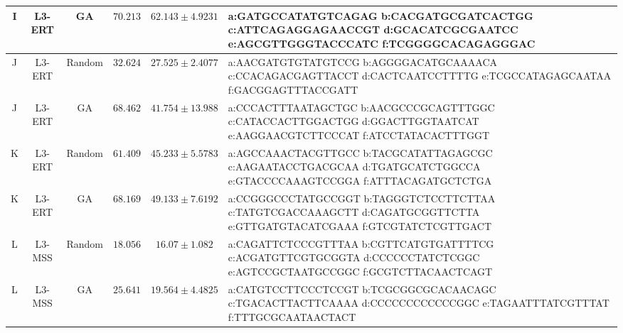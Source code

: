 \begin{table*}[h]
\begin{center}
{\begin{tabular}{|c| c c |c c| p{15cm}|}
    I & L3-ERT & GA & $70.213$ & $62.143\pm4.9231$ & a:GATGCCATATGTCAGAG b:CACGATGCGATCACTGG c:ATTCAGAGGAGAACCGT d:GCACATCGCGAATCC e:AGCGTTGGGTACCCATC f:TCGGGGCACAGAGGGAC \\
    \hline
    J & L3-ERT & Random & $32.624$ & $27.525\pm2.4077$ & a:AACGATGTGTATGTCCG b:AGGGGACATGCAAAACA c:CCACAGACGAGTTACCT d:CACTCAATCCTTTTG e:TCGCCATAGAGCAATAA f:GACGGAGTTTACCGATT \\
    J & L3-ERT & GA & $68.462$ & $41.754\pm13.988$ & a:CCCACTTTAATAGCTGC b:AACGCCCGCAGTTTGGC c:CATACCACTTGGACTGG d:GGACTTGGTAATCAT e:AAGGAACGTCTTCCCAT f:ATCCTATACACTTTGGT \\
    \hline
    K & L3-ERT & Random & $61.409$ & $45.233\pm5.5783$ & a:AGCCAAACTACGTTGCC b:TACGCATATTAGAGCGC c:AAGAATACCTGACGCAA d:TGATGCATCTGGCCA e:GTACCCCAAAGTCCGGA f:ATTTACAGATGCTCTGA \\
    K & L3-ERT & GA & $68.169$ & $49.133\pm7.6192$ & a:CCGGGCCCTATGCCGGT b:TAGGGTCTCCTTCTTAA c:TATGTCGACCAAAGCTT d:CAGATGCGGTTCTTA e:GTTGATGTACATCGAAA f:GTCGTATCTCGTTGACT \\
    \hline
    L & L3-MSS & Random & $18.056$ & $16.07\pm1.082$ & a:CAGATTCTCCCGTTTAA b:CGTTCATGTGATTTTCG c:ACGATGTTCGTGCGGTA d:CCCCCCTATCTCGGC e:AGTCCGCTAATGCCGGC f:GCGTCTTACAACTCAGT \\
    L & L3-MSS & GA & $25.641$ & $19.564\pm4.4825$ & a:CATGTCCTTCCCTCCGT b:TCGCGGCGCACAACAGC c:TGACACTTACTTCAAAA d:CCCCCCCCCCCCGGC e:TAGAATTTATCGTTTAT f:TTTGCGCAATAACTACT \\
    \hline
    \hline
\end{tabular}
}
\end{center}\label{tab:SIsequenceOptim}
\end{table*}